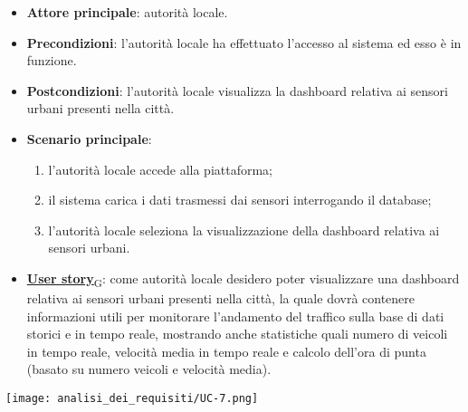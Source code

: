 \begin{itemize}
	\item \textbf{Attore principale}: autorità locale.
	\item \textbf{Precondizioni}: l'autorità locale ha effettuato l'accesso al sistema ed esso è in funzione.
	\item \textbf{Postcondizioni}: l'autorità locale visualizza la dashboard relativa
	      ai sensori urbani presenti nella città.
	\item \textbf{Scenario principale}:
	      \begin{enumerate}
		      \item l'autorità locale accede alla piattaforma;
		      \item il sistema carica i dati trasmessi dai sensori interrogando il database;
		      \item l'autorità locale seleziona la visualizzazione della dashboard relativa ai sensori urbani.
	      \end{enumerate}
	\item \href{https://7last.github.io/docs/pb/documentazione-interna/glossario\#user-story}{\textbf{User story}\textsubscript{G}}:
	      come autorità locale desidero poter visualizzare una dashboard relativa ai sensori urbani presenti nella città, la quale
	      dovrà contenere informazioni utili per monitorare l'andamento del traffico sulla base di dati storici e in tempo reale, mostrando
	      anche statistiche quali numero di veicoli in tempo reale, velocità media in tempo reale e calcolo dell'ora di punta (basato su numero veicoli e velocità media).
\end{itemize}
\begin{center}
	\texttt{[image: analisi\_dei\_requisiti/UC-7.png]}
\end{center}


